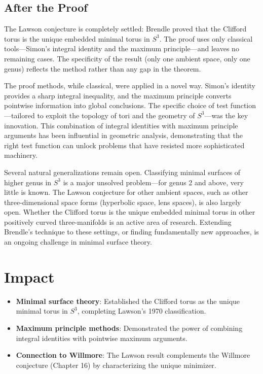 \subsection{After the Proof}

The Lawson conjecture is completely settled: Brendle proved that the Clifford torus is the unique embedded minimal torus in $S^3$. The proof uses only classical tools---Simon's integral identity and the maximum principle---and leaves no remaining cases. The specificity of the result (only one ambient space, only one genus) reflects the method rather than any gap in the theorem.

The proof methods, while classical, were applied in a novel way. Simon's identity provides a sharp integral inequality, and the maximum principle converts pointwise information into global conclusions. The specific choice of test function---tailored to exploit the topology of tori and the geometry of $S^3$---was the key innovation. This combination of integral identities with maximum principle arguments has been influential in geometric analysis, demonstrating that the right test function can unlock problems that have resisted more sophisticated machinery.

Several natural generalizations remain open. Classifying minimal surfaces of higher genus in $S^3$ is a major unsolved problem---for genus 2 and above, very little is known. The Lawson conjecture for other ambient spaces, such as other three-dimensional space forms (hyperbolic space, lens spaces), is also largely open. Whether the Clifford torus is the unique embedded minimal torus in other positively curved three-manifolds is an active area of research. Extending Brendle's technique to these settings, or finding fundamentally new approaches, is an ongoing challenge in minimal surface theory.

\section{Impact}
\begin{itemize}
\item \textbf{Minimal surface theory}: Established the Clifford torus as the unique minimal torus in $S^3$, completing Lawson's 1970 classification.
\item \textbf{Maximum principle methods}: Demonstrated the power of combining integral identities with pointwise maximum arguments.
\item \textbf{Connection to Willmore}: The Lawson result complements the Willmore conjecture (Chapter 16) by characterizing the unique minimizer.
\end{itemize}

